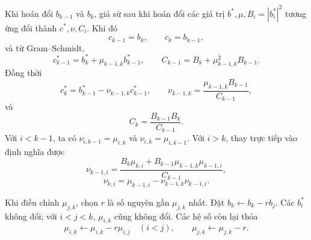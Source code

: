 \documentclass[11pt]{article}
\begin{document}
Khi hoán đổi \(b_{k-1}\) và \(b_k\), giả sử sau khi hoán đổi các giá trị
\(b^*,\mu,B_i=|b_i^*|^2\) tương ứng đổi thành \(c^*,\nu,C_i\). Khi đó
\[
  c_{k-1}=b_k,\qquad c_k=b_{k-1},
\]
và từ Gram--Schmidt,
\[
  c_{k-1}^*=b_k^*+\mu_{k-1,k}b_{k-1}^*,\qquad
  C_{k-1}=B_k+\mu_{k-1,k}^2B_{k-1}.
\]
Đồng thời
\[
  c_k^*=b_{k-1}^*-\nu_{k-1,k}c_{k-1}^*,\qquad
  \nu_{k-1,k}=\frac{\mu_{k-1,k}B_{k-1}}{C_{k-1}},
\]
và
\[
  C_k=\frac{B_{k-1}B_k}{C_{k-1}}.
\]
Với \(i<k-1\), ta có \(\nu_{i,k-1}=\mu_{i,k}\) và
\(\nu_{i,k}=\mu_{i,k-1}\). Với \(i>k\), thay trực tiếp vào định nghĩa được
\[
  \nu_{k-1,i}=\frac{B_k\mu_{k,i}+B_{k-1}\mu_{k-1,k}\mu_{k-1,i}}{C_{k-1}},
\]
\[
  \nu_{k,i}=\mu_{k-1,i}-\nu_{k-1,k}\nu_{k-1,i}.
\]

Khi điều chỉnh \(\mu_{j,k}\), chọn \(r\) là số nguyên gần \(\mu_{j,k}\) nhất.
Đặt \(b_k\leftarrow b_k-rb_j\). Các \(b_i^*\) không đổi; với \(i<j<k\),
\(\mu_{i,k}\) cũng không đổi. Các hệ số còn lại thỏa
\[
  \mu_{i,k}\leftarrow \mu_{i,k}-r\mu_{i,j}\quad (i<j),\qquad
  \mu_{j,k}\leftarrow \mu_{j,k}-r.
\]
\end{document}
